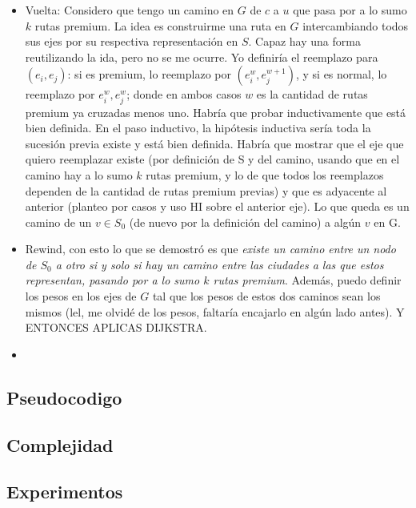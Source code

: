\begin{itemize}
	\item Vuelta: Considero que tengo un camino en $G$ de $c$ a $u$ que pasa por a lo sumo $k$ rutas premium. La idea es construirme una ruta en $G$ intercambiando todos sus ejes por su respectiva representación en $S$. Capaz hay una forma reutilizando la ida, pero no se me ocurre. Yo definiría el reemplazo para $(e_i, e_j)$: si es premium, lo reemplazo por $(e^w_i, e^{w+1}_j)$, y si es normal, lo reemplazo por $e^w_i, e^w_j$; donde en ambos casos $w$ es la cantidad de rutas premium ya cruzadas menos uno. Habría que probar inductivamente que está bien definida. En el paso inductivo, la hipótesis inductiva sería toda la sucesión previa existe y está bien definida. Habría que mostrar que el eje que quiero reemplazar existe (por definición de S y del camino, usando que en el camino hay a lo sumo $k$ rutas premium, y lo de que todos los reemplazos dependen de la cantidad de rutas premium previas) y que es adyacente al anterior (planteo por casos y uso HI sobre el anterior eje). Lo que queda es un camino de un $v \in S_0$ (de nuevo por la definición del camino) a algún $v$ en G. 
	
	\item Rewind, con esto lo que se demostró es que \textit{existe un camino entre un nodo de $S_0$ a otro si y solo si hay un camino entre las ciudades a las que estos representan, pasando por a lo sumo $k$ rutas premium}. Además, puedo definir los pesos en los ejes de $G$ tal que los pesos de estos dos caminos sean los mismos (lel, me olvidé de los pesos, faltaría encajarlo en algún lado antes). Y ENTONCES APLICAS DIJKSTRA.
	
	\item 
	 
\end{itemize}
\subsection{Pseudocodigo}
\subsection{Complejidad}
\subsection{Experimentos}